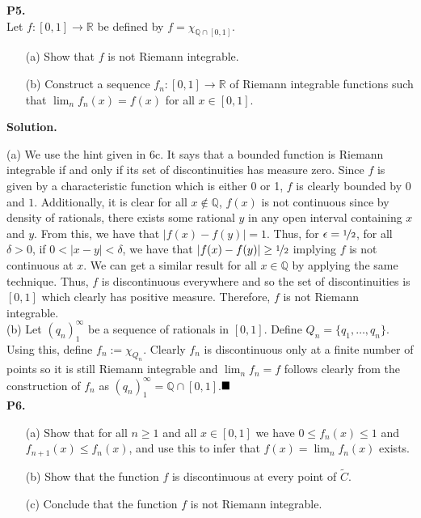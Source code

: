 \documentclass{article}
\begin{document}
    \newpage

    \textbf{P5.}\\

    Let $f:[0,1]\to\mathbb{R}$ be defined by $f = \chi_{\mathbb{Q}\cap[0,1]}$.
    \begin{enumerate}
        \item[(a)] Show that $f$ is not Riemann integrable.
        \item[(b)] Construct a sequence $f_n:[0,1]\to\mathbb{R}$ of Riemann integrable functions such that $\lim_n f_n(x) = f(x)$
            for all $x\in[0,1]$.
    \end{enumerate}
    \textbf{Solution.}

    (a) We use the hint given in 6c. It says that a bounded function is Riemann integrable if and only if its set of discontinuities
    has measure zero. Since $f$ is given by a characteristic function which is either 0 or 1, $f$ is clearly bounded by $0$ and $1$.
    Additionally, it is clear for all $x\not\in\mathbb{Q}$, $f(x)$ is not continuous since by density of rationals, there exists
    some rational $y$ in any open interval containing $x$ and $y$. From this, we have that $|f(x) - f(y)| = 1$. Thus, for
    $\epsilon = \nicefrac{1}{2}$, for all $\delta>0$, if $0<|x-y|<\delta$, we have that $|f(x)-f(y)|\geq\nicefrac{1}{2}$ implying
    $f$ is not continuous at $x$. We can get a similar result for all $x\in\mathbb{Q}$ by applying the same technique. Thus,
    $f$ is discontinuous everywhere and so the set of discontinuities is $[0,1]$ which clearly has positive measure. Therefore,
    $f$ is not Riemann integrable.\\

    (b) Let $(q_n)_1^{\infty}$ be a sequence of rationals in $[0,1]$. Define $Q_n = \{q_1,\hdots,q_n\}$. Using this, define
    $f_n := \chi_{Q_n}$. Clearly $f_n$ is discontinuous only at a finite number of points so it is still Riemann integrable
    and $\lim_n f_n = f$ follows clearly from the construction of $f_n$ as $(q_n)_1^{\infty} = \mathbb{Q}\cap[0,1]$.$\hfill\blacksquare$\\

    \textbf{P6.}
    \begin{enumerate}
        \item[(a)] Show that for all $n\geq 1$ and all $x\in[0,1]$ we have $0\leq f_n(x)\leq 1$ and $f_{n+1}(x)\leq f_n(x)$, and
            use this to infer that $f(x) = \lim_n f_n(x)$ exists.
        \item[(b)] Show that the function $f$ is discontinuous at every point of $\widetilde{C}$.
        \item[(c)] Conclude that the function $f$ is not Riemann integrable.
    \end{enumerate}
\end{document}
